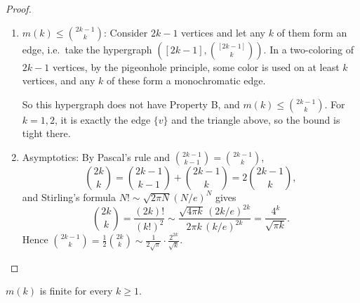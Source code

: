 \begin{proof}
\begin{enumerate}[(1), beginpenalty=10000]
        \item \(m(k) \le \binom{2k-1}{k}\): Consider \(2k - 1\) vertices and let any \(k\) of them form an edge, i.e.\ take the hypergraph \(\left( [2k-1], \binom{[2k-1]}{k} \right)\). In a two-coloring of \(2k - 1\) vertices, by the pigeonhole principle, some color is used on at least \(k\) vertices, and any \(k\) of these form a monochromatic edge.
        \begin{center}
        \end{center}
        So this hypergraph does not have Property B, and \(m(k) \le \binom{2k-1}{k}\). For \(k = 1, 2\), it is exactly the edge \(\{v\}\) and the triangle above, so the bound is tight there.

        \item Asymptotics: By Pascal's rule and \(\binom{2k-1}{k-1} = \binom{2k-1}{k}\),
        \[
            \binom{2k}{k} = \binom{2k-1}{k-1} + \binom{2k-1}{k} = 2 \binom{2k-1}{k},
        \]
        and Stirling's formula \(N! \sim \sqrt{2\pi N} (N/e)^N\) gives
        \[
            \binom{2k}{k} = \frac{(2k)!}{(k!)^2} \sim \frac{\sqrt{4\pi k}\, (2k/e)^{2k}}{2\pi k\, (k/e)^{2k}} = \frac{4^k}{\sqrt{\pi k}}.
        \]
        Hence \(\binom{2k-1}{k} = \frac{1}{2} \binom{2k}{k} \sim \frac{1}{2\sqrt{\pi}} \cdot \frac{2^{2k}}{\sqrt{k}}\).\qedhere
    \end{enumerate}
\end{proof}

\begin{corollary}\label{cor:m-finite}
    \(m(k)\) is finite for every \(k \ge 1\).
\end{corollary}

